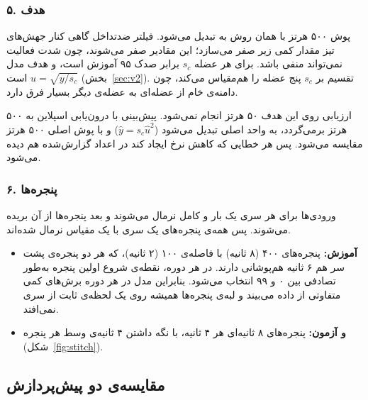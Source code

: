 \subsubsection*{۵. هدف}
پوش ۵۰۰ هرتز  با همان روش به  تبدیل می‌شود. فیلتر ضدتداخل گاهی کنار جهش‌های تیز مقدار کمی زیر صفر می‌سازد؛ این مقادیر صفر می‌شوند، چون شدت فعالیت نمی‌تواند منفی باشد. برای هر عضله $s_c$ برابر صدک ۹۵  آموزش است، و هدف مدل $u=\sqrt{y/s_c}$ است (بخش~\ref{sec:v2}). تقسیم بر $s_c$ پنج عضله را هم‌مقیاس می‌کند، چون دامنه‌ی خام  از عضله‌ای به عضله‌ی دیگر بسیار فرق دارد.

ارزیابی روی این هدف ۵۰ هرتز انجام نمی‌شود. پیش‌بینی با درون‌یابی اسپلاین به ۵۰۰ هرتز برمی‌گردد، به واحد اصلی تبدیل می‌شود ($\hat y=s_c\hat u^2$) و با پوش اصلی ۵۰۰ هرتز مقایسه می‌شود. پس هر خطایی که کاهش نرخ ایجاد کند در اعداد گزارش‌شده هم دیده می‌شود.

\subsubsection*{۶. پنجره‌ها}
ورودی‌ها برای هر سری یک بار و کامل نرمال می‌شوند و بعد پنجره‌ها از آن بریده می‌شوند. پس همه‌ی پنجره‌های یک سری با یک مقیاس نرمال شده‌اند.
\begin{itemize}
\item \textbf{آموزش:} پنجره‌های ۴۰۰  (۸ ثانیه) با فاصله‌ی ۱۰۰  (۲ ثانیه)، که هر دو پنجره‌ی پشت سر هم ۶ ثانیه هم‌پوشانی دارند. در هر دوره، نقطه‌ی شروع اولین پنجره به‌طور تصادفی بین ۰ و ۹۹  انتخاب می‌شود. بنابراین مدل در هر دوره برش‌های کمی متفاوتی از داده می‌بیند و لبه‌ی پنجره‌ها همیشه روی یک لحظه‌ی ثابت از سری نمی‌افتد.
\item \textbf{ و آزمون:} پنجره‌های ۸ ثانیه‌ای هر ۴ ثانیه، با نگه داشتن ۴ ثانیه‌ی وسط هر پنجره (شکل~\ref{fig:stitch}).
\end{itemize}

\subsection{مقایسه‌ی دو پیش‌پردازش}

